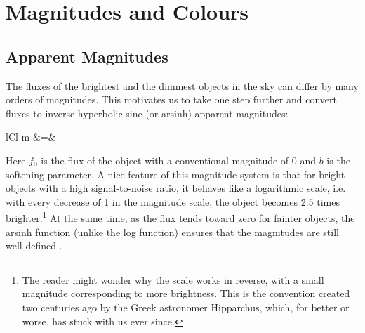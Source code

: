 \section{Magnitudes and Colours}
\subsection{Apparent Magnitudes}
The fluxes of the brightest and the dimmest objects in the sky can differ by many orders of
magnitudes. This motivates us to take one step further and convert fluxes to inverse
hyperbolic sine (or arsinh) apparent magnitudes:
	\begin{IEEEeqnarray*}{lCl}
		m &=& - 
	\end{IEEEeqnarray*}
Here $f_0$ is the flux of the object with a conventional magnitude of 0 and $b$ is the
softening parameter. A nice feature of this magnitude system is that for bright objects
with a high signal-to-noise ratio, it behaves like a logarithmic scale, i.e. with
every decrease of 1 in the magnitude scale, the object becomes 2.5 times brighter.\footnote{
	The reader might wonder why the scale works in reverse, with a small magnitude
	corresponding to more brightness. This is the convention created two centuries ago by
	the Greek astronomer Hipparchus, which, for better or worse, has stuck with us ever since.}
At the same time, as the flux tends toward zero for fainter objects, the arsinh function
(unlike the log function) ensures that the magnitudes are still well-defined \cite{lupton99}.

